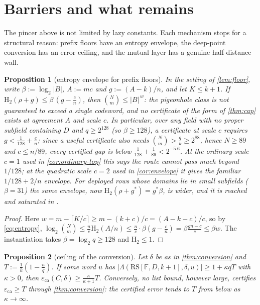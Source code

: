 \documentclass[11pt]{amsart}
\newtheorem{proposition}[proposition]{Proposition}
\theoremstyle{definition}
\theoremstyle{remark}
\newcommand{\F}{\mathbb{F}}
\newcommand{\RS}{\mathrm{RS}}
\newcommand{\eca}{\varepsilon_{\mathrm{ca}}}
\newcommand{\Lst}{\Lambda}
\newcommand{\Hb}{\mathrm{H}_2}
\begin{document}
\section{Barriers and what remains}\label{sec:barriers}

The pincer above is not limited by lazy constants.  Each mechanism stops for a
structural reason: prefix floors have an entropy envelope, the deep-point
conversion has an error ceiling, and the mutual layer has a genuine
half-distance wall.

\begin{proposition}[entropy envelope for prefix floors]\label{prop:envelope-barrier}
In the setting of \cref{lem:floor}, write $\beta:=\log_2|B|$, $A:=mc$ and
$g:=(A-k)/n$, and let $K\le k+1$. If
$\Hb(\rho+g)\le\beta\,(g-\tfrac cn)$, then $\binom Nm\le|B|^{\,w}$: the
pigeonhole class is not guaranteed to exceed a single codeword, and no
certificate of the form of \cref{thm:cap} exists at agreement $A$ and scale $c$.
In particular, over any field with no proper subfield containing $D$ and
$q\ge2^{128}$ (so $\beta\ge128$), a certificate at scale $c$ requires
$g<\frac1{128}+\frac cn$; since a useful certificate also needs
$\binom Nm>\frac qk\ge2^{88}$, hence $N\ge89$ and $c\le n/89$, every certified
gap is below $\frac1{128}+\frac1{89}<2^{-5.6}$. At the ordinary scale $c=1$ used
in \cref{cor:ordinary-top} this says the route cannot pass much beyond
$1/128$; at the quadratic scale $c=2$ used in \cref{cor:envelope} it gives the
familiar $1/128+2/n$ envelope. For deployed rows whose domains lie in small
subfields ($\beta=31$) the same envelope, now $\Hb(\rho+g^*)=g^*\beta$, is wider,
and it is reached and saturated in \cite{Cho26b}.
\end{proposition}

\begin{proof}
Here $w=m-\lceil K/c\rceil\ge m-(k+c)/c=(A-k-c)/c$, so by \eqref{eq:entropy},
$\log_2\binom Nm\le\frac nc\Hb(A/n)\le\frac nc\cdot\beta(g-\frac cn)=\beta\frac{gn-c}c\le\beta w$. The instantiation takes $\beta=\log_2q\ge128$ and $\Hb\le1$.
\end{proof}

\begin{proposition}[ceiling of the conversion]\label{prop:ceiling}
Let $\delta$ be as in \cref{thm:conversion} and
$T:=\frac1k(1-\frac nq)$. If some word $u$ has
$|\Lst(\RS[\F,D,k+1],\delta,u)|\ge1+\kappa qT$ with $\kappa>0$, then
$\eca(C,\delta)\ge\frac{\kappa}{\kappa+1}T$. Conversely, no list bound, however
large, certifies $\eca\ge T$ through \cref{thm:conversion}: the certified error
tends to $T$ from below as $\kappa\to\infty$.
\end{proposition}
\end{document}
